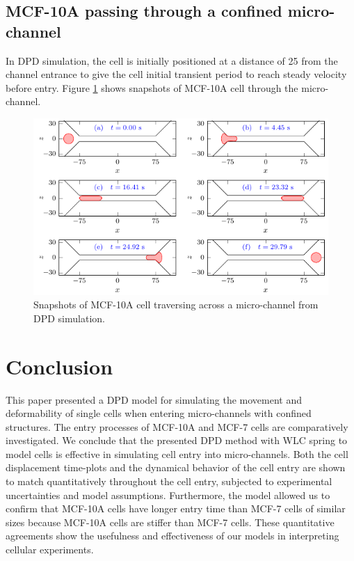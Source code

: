 \documentclass[review]{elsarticle}
\begin{document}
\subsection{MCF-10A passing through a confined micro-channel}
In DPD simulation, the cell is initially positioned at a distance of 25 from the channel entrance to give the cell initial transient period to reach steady velocity before entry. Figure \ref{fig:Snapshots-DPD} shows snapshots of MCF-10A cell through the micro-channel.
\begin{figure}[!htb]
\centering
\includegraphics{Snapshots-DPD.pdf}
\caption{Snapshots of MCF-10A cell traversing across a micro-channel from DPD simulation.} \label{fig:Snapshots-DPD}
\end{figure}

\section{Conclusion}\label{conclusion}

This paper presented a DPD model for simulating the movement and deformability of single cells when entering micro-channels with confined structures.  The entry processes of MCF-10A and MCF-7 cells are comparatively investigated. We conclude that the presented DPD method with WLC spring to model cells is effective in simulating cell entry into micro-channels. Both the cell displacement time-plots and the dynamical behavior of the cell entry are shown to match quantitatively throughout the cell entry, subjected to experimental uncertainties and model assumptions. Furthermore, the model allowed us to confirm that MCF-10A cells have longer entry time than MCF-7 cells of similar sizes because MCF-10A cells are stiffer than MCF-7 cells. These quantitative agreements show the usefulness and effectiveness of our models in interpreting cellular experiments.
\end{document}

